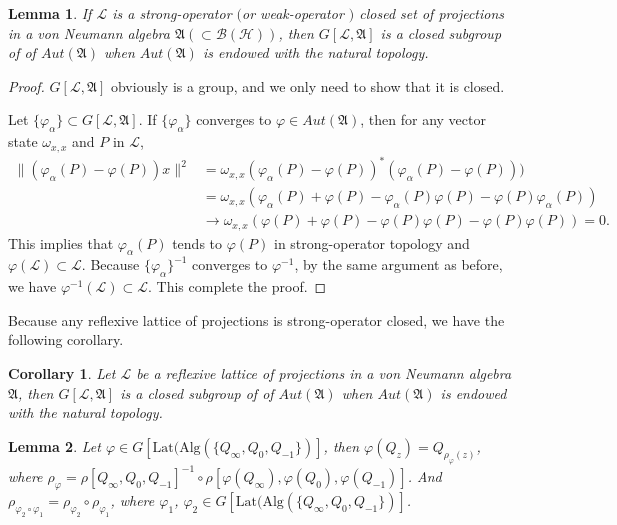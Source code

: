 \documentclass{amsart}
\newcommand{\AAA}{\mathfrak A}
\newcommand{\B}{\mathcal B}
\newcommand{\HHH}{\mathcal H} %
\newcommand{\LLL}{\mathcal L} %
\newcommand{\Lat}{\mathrm{Lat}}
\newcommand{\Alg}{\mathrm{Alg}}
\newtheorem{corollary}{Corollary}[section]
\newtheorem{lemma}{Lemma}[section]
\begin{document}
 
 
\begin{lemma}\label{2lemma2}
If $\LLL$ is a strong-operator  $($or weak-operator $)$ closed set of projections in a von Neumann algebra $\AAA( \subset \B(\HHH))$,
then $G[\LLL, \AAA]$ is a closed subgroup of of $Aut(\AAA)$ when $Aut(\AAA)$ is endowed with the natural topology.
\end{lemma}

\begin{proof}
$G[\LLL, \AAA]$ obviously is a group, and we only need to show that it is closed.

Let $\{\varphi_{\alpha} \} \subset G[\LLL, \AAA]$. If $\{\varphi_{\alpha} \}$ converges to $\varphi \in Aut(\AAA)$, then for any vector state
$\omega_{x, x}$ and $P$ in $\LLL$,
\begin{align*}
\|(\varphi_{\alpha}(P) - \varphi(P))x\|^{2} &= \omega_{x,x}(\varphi_{\alpha}(P) - \varphi(P))^{*}(\varphi_{\alpha}(P) - \varphi(P)))\\
                                                               &= \omega_{x,x}(\varphi_{\alpha}(P) + \varphi(P) - \varphi_{\alpha}(P)\varphi(P) - \varphi(P)\varphi_{\alpha}(P)) \\
                                                               & \rightarrow \omega_{x,x}(\varphi(P) + \varphi(P) - \varphi(P)\varphi(P) - \varphi(P)\varphi(P)) = 0.
\end{align*}
This implies that $\varphi_{\alpha}(P)$ tends to $\varphi(P)$ in strong-operator topology and $\varphi(\LLL) \subset \LLL$. Because 
$\{\varphi_{\alpha} \} ^{-1}$ converges to $\varphi^{-1}$, by the same argument as before, we have $\varphi^{-1}(\LLL) \subset \LLL$.
This complete the proof.
\end{proof}

Because any reflexive lattice of projections is strong-operator closed, we have the following corollary.

\begin{corollary}
Let $\LLL$ be a reflexive lattice of projections in a  von Neumann algebra $\AAA$, 
then $G[\LLL, \AAA]$ is a closed subgroup of of $Aut(\AAA)$ when $Aut(\AAA)$ is endowed with the natural topology.
\end{corollary}

\begin{lemma}\label{2lemma4}
Let $\varphi \in G[\Lat(\Alg( \{ Q_{\infty},  Q_{0}, Q_{-1} \})]$, then $\varphi(Q_{z}) = Q_{\rho_{\varphi} (z)}$, where
$\rho_{\varphi} = \rho[Q_\infty, Q_0, Q_{-1}]^{-1} \circ  \rho[\varphi(Q_{\infty}), \varphi(Q_{0}), \varphi(Q_{-1})]$.
And $\rho_{\varphi_{2} \circ \varphi_{1}} = \rho_{\varphi_{2}} \circ \rho_{\varphi_{1}}$, where $\varphi_1$, $\varphi_2 \in  G[\Lat(\Alg( \{ Q_{\infty},  Q_{0}, Q_{-1} \})]$.
\end{lemma}
\end{document}
